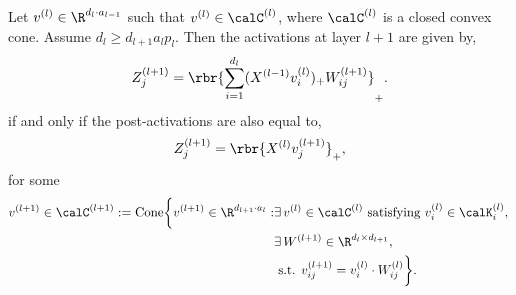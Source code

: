 \documentclass{article}
\newcommand{\calKl}{\calK^{(l)}}
\begin{document}
\begin{lemma}
    Let \( v^{(l)} \in \R^{d_l \cdot a_{l-1}} \) such that
    \( v^{(l)} \in \calC^{(l)} \), where \( \calC^{(l)} \) is a closed convex
    cone.
    Assume \( d_l \geq d_{l+1} a_l p_l \).
    Then the activations at layer \( l+1 \) are given by,
    \begin{equation}\label{eq:assumed-structure}
        Z_{j}^{(l+1)} = \rbr{\sum_{i = 1}^{d_{l}} (X^{(l-1)} v^{(l)}_i)_+
        W_{ij}^{(l+1)}}_+.
    \end{equation}
    if and only if the post-activations are also equal to,
    \begin{equation}
        Z_{j}^{(l+1)} = \rbr{X^{(l)} v^{(l+1)}_{j}}_+,
    \end{equation}
    for some
    \begin{equation}
        \begin{aligned}
            v^{(l+1)} \in \calC^{(l+1)}
            :=
            \text{Cone} \bigg\{
            v^{(l+1)} \in \R^{d_{l+1} \cdot a_l} :
             & \exists \, v^{(l)} \in \calC^{(l)}
            \text{ satisfying } v_{i}^{(l)} \in \calKl_i, \,                 \\
             & \exists \, W^{(l+1)} \in \R^{d_l \times d_{l+1}},             \\
             & \text{ s.t. } v^{(l+1)}_{ij} = v^{(l)}_{i} \cdot W_{ij}^{(l)}
            \bigg\}.
        \end{aligned}
    \end{equation}
\end{lemma}
\end{document}
